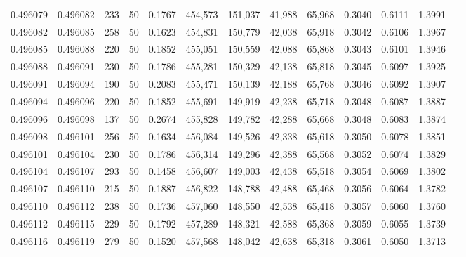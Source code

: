 \begin{tabular}{rrrrrrrrrrrrr}
0.496079 & 0.496082 &   233 &  50 &                                     0.1767 & 454,573 & 151,037 &  41,988 &  65,968 & 0.3040 & 0.6111 & 1.3991 \\
0.496082 & 0.496085 &   258 &  50 &                                     0.1623 & 454,831 & 150,779 &  42,038 &  65,918 & 0.3042 & 0.6106 & 1.3967 \\
0.496085 & 0.496088 &   220 &  50 &                                     0.1852 & 455,051 & 150,559 &  42,088 &  65,868 & 0.3043 & 0.6101 & 1.3946 \\
0.496088 & 0.496091 &   230 &  50 &                                     0.1786 & 455,281 & 150,329 &  42,138 &  65,818 & 0.3045 & 0.6097 & 1.3925 \\
0.496091 & 0.496094 &   190 &  50 &                                     0.2083 & 455,471 & 150,139 &  42,188 &  65,768 & 0.3046 & 0.6092 & 1.3907 \\
0.496094 & 0.496096 &   220 &  50 &                                     0.1852 & 455,691 & 149,919 &  42,238 &  65,718 & 0.3048 & 0.6087 & 1.3887 \\
0.496096 & 0.496098 &   137 &  50 &                                     0.2674 & 455,828 & 149,782 &  42,288 &  65,668 & 0.3048 & 0.6083 & 1.3874 \\
0.496098 & 0.496101 &   256 &  50 &                                     0.1634 & 456,084 & 149,526 &  42,338 &  65,618 & 0.3050 & 0.6078 & 1.3851 \\
0.496101 & 0.496104 &   230 &  50 &                                     0.1786 & 456,314 & 149,296 &  42,388 &  65,568 & 0.3052 & 0.6074 & 1.3829 \\
0.496104 & 0.496107 &   293 &  50 &                                     0.1458 & 456,607 & 149,003 &  42,438 &  65,518 & 0.3054 & 0.6069 & 1.3802 \\
0.496107 & 0.496110 &   215 &  50 &                                     0.1887 & 456,822 & 148,788 &  42,488 &  65,468 & 0.3056 & 0.6064 & 1.3782 \\
0.496110 & 0.496112 &   238 &  50 &                                     0.1736 & 457,060 & 148,550 &  42,538 &  65,418 & 0.3057 & 0.6060 & 1.3760 \\
0.496112 & 0.496115 &   229 &  50 &                                     0.1792 & 457,289 & 148,321 &  42,588 &  65,368 & 0.3059 & 0.6055 & 1.3739 \\
0.496116 & 0.496119 &   279 &  50 &                                     0.1520 & 457,568 & 148,042 &  42,638 &  65,318 & 0.3061 & 0.6050 & 1.3713 \\

\end{tabular}
